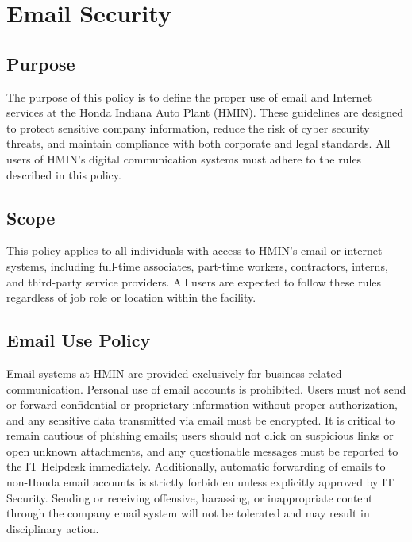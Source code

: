 \chapter{Email Security}
\pagestyle{fancy}

\fancyhf{}

\fancyfoot[C]{\thepage}

\renewcommand{\headrulewidth}{0pt}
\renewcommand{\footrulewidth}{0pt}

\section{Purpose}

The purpose of this policy is to define the proper use of email and Internet services at the Honda Indiana Auto Plant (HMIN). These guidelines are designed to protect sensitive company information, reduce the risk of cyber security threats, and maintain compliance with both corporate and legal standards. All users of HMIN’s digital communication systems must adhere to the rules described in this policy.

\section{Scope}

This policy applies to all individuals with access to HMIN’s email or internet systems, including full-time associates, part-time workers, contractors, interns, and third-party service providers. All users are expected to follow these rules regardless of job role or location within the facility.

\section{Email Use Policy}

Email systems at HMIN are provided exclusively for business-related communication. Personal use of email accounts is prohibited. Users must not send or forward confidential or proprietary information without proper authorization, and any sensitive data transmitted via email must be encrypted. It is critical to remain cautious of phishing emails; users should not click on suspicious links or open unknown attachments, and any questionable messages must be reported to the IT Helpdesk immediately. Additionally, automatic forwarding of emails to non-Honda email accounts is strictly forbidden unless explicitly approved by IT Security. Sending or receiving offensive, harassing, or inappropriate content through the company email system will not be tolerated and may result in disciplinary action.

